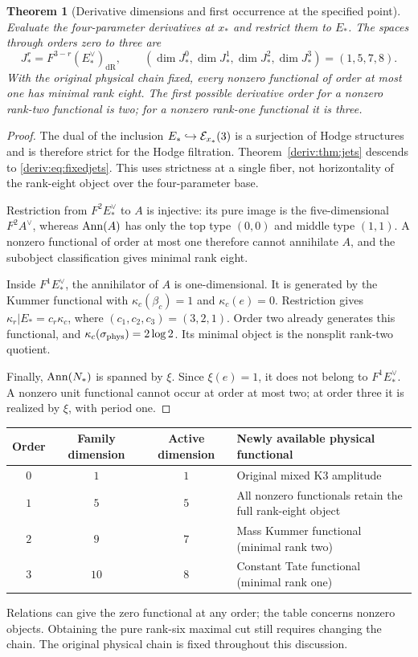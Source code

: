 \documentclass[11pt,a4paper,oneside]{article}
\theoremstyle{plain}
\newtheorem{theorem}{Theorem}[section]
\theoremstyle{definition}
\theoremstyle{remark}
\newcommand{\dR}{\mathrm{dR}}
\numberwithin{equation}{section}
\begin{document}
\begin{theorem}[Derivative dimensions and first occurrence at the specified point]\label{deriv:thm:fixed}
Evaluate the four-parameter derivatives at $x_*$ and restrict them to $E_*$. The spaces through orders zero to three are
\begin{equation}\label{deriv:eq:fixedjets}
 \boxed{J_*^r=F^{3-r}(E_*^\vee)_{\dR},\qquad
 (\dim J_*^0,\dim J_*^1,\dim J_*^2,\dim J_*^3)=(1,5,7,8).}
\end{equation}
With the original physical chain fixed, every nonzero functional of order at most one has minimal rank eight. The first possible derivative order for a nonzero rank-two functional is two; for a nonzero rank-one functional it is three.
\end{theorem}
\begin{proof}
The dual of the inclusion $E_*\hookrightarrow\mathcal E_{x_*}(3)$ is a surjection of Hodge structures and is therefore strict for the Hodge filtration. Theorem~\ref{deriv:thm:jets} descends to \eqref{deriv:eq:fixedjets}. This uses strictness at a single fiber, not horizontality of the rank-eight object over the four-parameter base.

Restriction from $F^2E_*^\vee$ to $A$ is injective: its pure image is the five-dimensional $F^2A^\vee$, whereas $\operatorname{Ann}(A)$ has only the top type $(0,0)$ and middle type $(1,1)$. A nonzero functional of order at most one therefore cannot annihilate $A$, and the subobject classification gives minimal rank eight.

Inside $F^1E_*^\vee$, the annihilator of $A$ is one-dimensional. It is generated by the Kummer functional with $\kappa_c(\beta_c)=1$ and $\kappa_c(e)=0$. Restriction gives $\kappa_r|E_*=c_r\kappa_c$, where $(c_1,c_2,c_3)=(3,2,1)$. Order two already generates this functional, and $\kappa_c(\sigma_{\rm phys})=2\log2$. Its minimal object is the nonsplit rank-two quotient.

Finally, $\operatorname{Ann}(N_*)$ is spanned by $\xi$. Since $\xi(e)=1$, it does not belong to $F^1E_*^\vee$. A nonzero unit functional cannot occur at order at most two; at order three it is realized by $\xi$, with period one.
\end{proof}

\begin{center}\small
\begin{tabular}{c|c|c|p{65mm}}
\toprule
Order & Family dimension & Active dimension & Newly available physical functional\\
\midrule
$0$&$1$&$1$&Original mixed K3 amplitude\\
$1$&$5$&$5$&All nonzero functionals retain the full rank-eight object\\
$2$&$9$&$7$&Mass Kummer functional (minimal rank two)\\
$3$&$10$&$8$&Constant Tate functional (minimal rank one)\\
\bottomrule
\end{tabular}
\end{center}
Relations can give the zero functional at any order; the table concerns nonzero objects. Obtaining the pure rank-six maximal cut still requires changing the chain. The original physical chain is fixed throughout this discussion.
\end{document}
